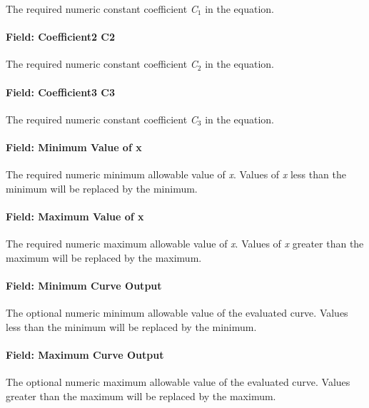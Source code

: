 The required numeric constant coefficient \emph{C\(_{1}\)} in the equation.

\paragraph{Field: Coefficient2 C2}\label{field-coefficient2-c2-3}

The required numeric constant coefficient \emph{C\(_{2}\)} in the equation.

\paragraph{Field: Coefficient3 C3}\label{field-coefficient3-c3-3}

The required numeric constant coefficient \emph{C\(_{3}\)} in the equation.

\paragraph{Field: Minimum Value of x}\label{field-minimum-value-of-x-15}

The required numeric minimum allowable value of \emph{x}. Values of \emph{x} less than the minimum will be replaced by the minimum.

\paragraph{Field: Maximum Value of x}\label{field-maximum-value-of-x-16}

The required numeric maximum allowable value of \emph{x}. Values of \emph{x} greater than the maximum will be replaced by the maximum.

\paragraph{Field: Minimum Curve Output}\label{field-minimum-curve-output-15}

The optional numeric minimum allowable value of the evaluated curve. Values less than the minimum will be replaced by the minimum.

\paragraph{Field: Maximum Curve Output}\label{field-maximum-curve-output-14}

The optional numeric maximum allowable value of the evaluated curve. Values greater than the maximum will be replaced by the maximum.


